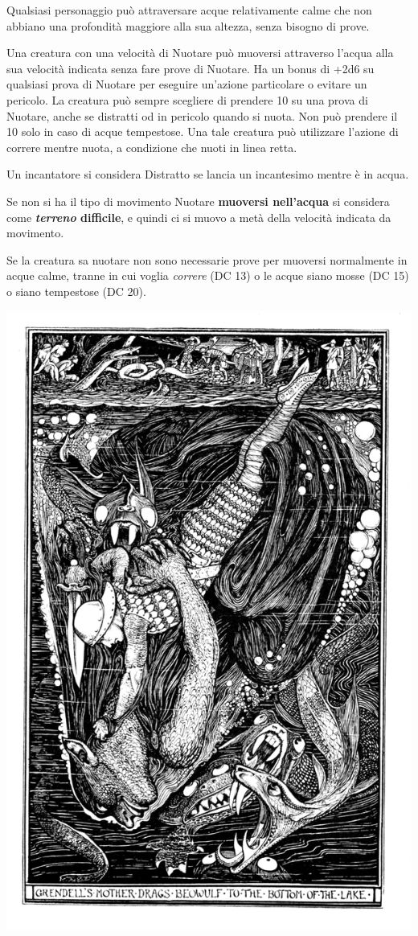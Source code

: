 \begin{multicols}{2}
Qualsiasi personaggio può attraversare acque relativamente calme che non abbiano una profondità maggiore alla sua altezza, senza bisogno di prove.

Una creatura con una velocità di Nuotare può muoversi attraverso l'acqua alla sua velocità indicata senza fare prove di Nuotare. Ha un bonus di +2d6 su qualsiasi prova di Nuotare per eseguire un'azione particolare o evitare un pericolo.
La creatura può sempre scegliere di prendere 10 su una prova di Nuotare, anche se distratti od in pericolo quando si nuota. Non può prendere il 10 solo in caso di acque tempestose. Una tale creatura può utilizzare l'azione di correre mentre nuota, a condizione che nuoti in linea retta.

Un incantatore si considera Distratto se lancia un incantesimo mentre è in acqua.

Se non si ha il tipo di movimento Nuotare \textbf{muoversi nell'acqua} si considera come \textbf{\emph{terreno} difficile}, e quindi ci si muovo a metà della velocità indicata da movimento.

Se la creatura sa nuotare non sono necessarie prove per muoversi normalmente in acque calme, tranne in cui voglia \emph{correre} (DC 13) o le acque siano mosse (DC 15) o siano tempestose (DC 20).


\medskip

\begin{center}
	\includegraphics[width=0.7\linewidth]{immagini/affogare.png}


\end{center}
\end{multicols}
